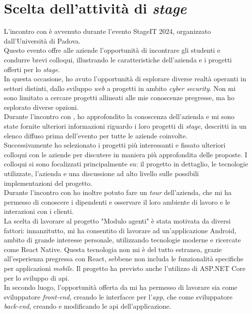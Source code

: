 \section{Scelta dell'attività di \textit{stage}}
L'incontro con {\company} è avvenuto durante l'evento StageIT 2024, organizzato dall'Università di Padova.\\
Questo evento offre alle aziende l'opportunità di incontrare gli studenti e condurre brevi colloqui, illustrando le 
caratteristiche dell'azienda e i progetti offerti per lo \textit{stage}.\\
In questa occasione, ho avuto l'opportunità di esplorare diverse realtà operanti in settori distinti, dallo sviluppo 
\textit{web} a progetti in ambito \textit{cyber security}. Non mi sono limitato a cercare progetti allineati alle mie 
conoscenze pregresse, ma ho esplorato diverse opzioni.\\
Durante l'incontro con {\company}, ho approfondito la conoscenza dell'azienda e mi sono state fornite ulteriori informazioni 
riguardo i loro progetti di \textit{stage}, descritti in un elenco diffuso prima dell'evento per tutte le 
aziende coinvolte.\\
Successivamente ho selezionato i progetti più interessanti e fissato ulteriori colloqui con
le aziende per discutere in maniera più approfondita delle proposte. I colloqui si sono focalizzati principalmente su: 
il progetto in dettaglio, le tecnologie utilizzate, l'azienda e una discussione ad alto livello
sulle possibili implementazioni del progetto.\\
Durante l'incontro con {\company} ho inoltre potuto fare un \textit{tour} dell'azienda, che mi ha permesso di conoscere i 
dipendenti e osservare il loro ambiente di lavoro e le interazioni con i clienti.\\
La scelta di lavorare al progetto "Modulo agenti" è stata motivata da diversi fattori:
innanzitutto, mi ha consentito di lavorare ad un'applicazione Android, ambito di grande interesse personale, utilizzando tecnologie
moderne e ricercate come React Native. Questa tecnologia non mi è del tutto estranea, grazie all'esperienza
pregressa con React, sebbene non includa le funzionalità specifiche per applicazioni \textit{mobile}. 
Il progetto ha previsto anche l'utilizzo di ASP.NET Core per lo sviluppo di \gls{api}.\\
In secondo luogo, l'opportunità offerta da {\company} mi ha permesso di lavorare sia come sviluppatore \textit{front-end},
creando le interfacce per l'\textit{app}, che come sviluppatore \textit{back-end}, creando e modificando le 
\gls{api} dell'applicazione.
